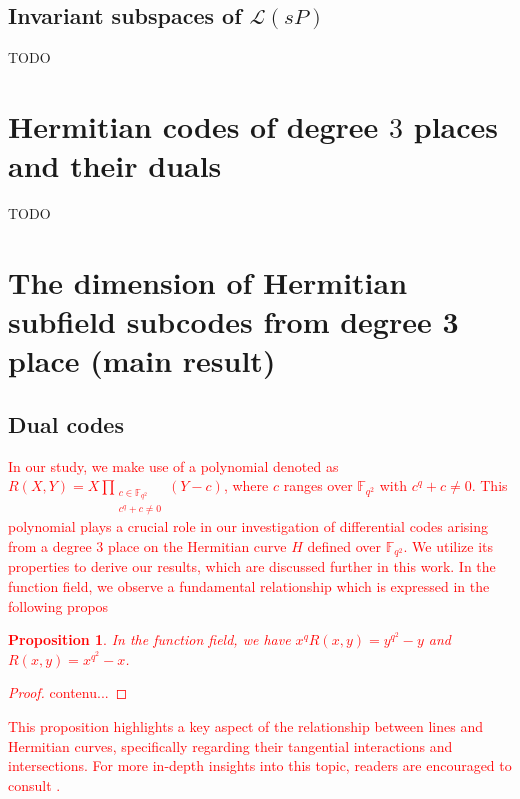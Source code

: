 \documentclass[a4paper]{amsart}
\theoremstyle{plain}
\newtheorem{proposition}[theorem]{Proposition}
\theoremstyle{definition}
\theoremstyle{remark}
\begin{document}
\subsection{Invariant subspaces of $\mathscr{L}(sP)$}

TODO

\section{Hermitian codes of degree $3$ places and their duals}

TODO

\section{The dimension of Hermitian subfield subcodes from degree 3 place (main result)}

\subsection{Dual codes}

\textcolor{red}{
In our study, we make use of a polynomial denoted as $R(X,Y) = X \prod\limits_{\substack{c \in \mathbb{F}_{q^2} \\ c^q + c \neq 0}} (Y-c)$, where $c$ ranges over $\mathbb{F}_{q^2}$ with $c^q + c \neq 0$. This polynomial plays a crucial role in our investigation of differential codes arising from a degree 3 place on the Hermitian curve $H$ defined over $\mathbb{F}_{q^2}$. We utilize its properties to derive our results, which are discussed further in this work.
In the function field, we observe a fundamental relationship which is expressed in the following propos
\begin{proposition}
	In the function field, we have $x^{q}R(x, y) = y^{q^2} - y$ and $R(x, y) = x^{q^2} - x$.
\end{proposition} 
\begin{proof}
	contenu...
\end{proof}
This proposition highlights a key aspect of the relationship between lines and Hermitian curves, specifically regarding their tangential interactions and intersections. For more in-depth insights into this topic, readers are encouraged to consult \cite[Section~2]{korchmaros2013hermitian}.}
\end{document}

